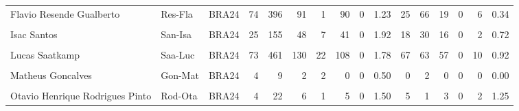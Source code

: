 \documentclass[
]{book}
\begin{document}
\begin{table}[!h]
{\begin{tabular}[t]{lllrrrrrrrrrrrrr}
Flavio Resende Gualberto & Res-Fla & BRA24 & 74 & 396 & 91 & 1 & 90 & 0 & 1.23 & 25 & 66 & 19 & 0 & 6 & 0.34\\
\cellcolor{gray!10}{Henrique Honorato} & \cellcolor{gray!10}{Hon-Hen} & \cellcolor{gray!10}{BRA24} & \cellcolor{gray!10}{1} & \cellcolor{gray!10}{15} & \cellcolor{gray!10}{3} & \cellcolor{gray!10}{0} & \cellcolor{gray!10}{3} & \cellcolor{gray!10}{0} & \cellcolor{gray!10}{3.00} & \cellcolor{gray!10}{0} & \cellcolor{gray!10}{3} & \cellcolor{gray!10}{0} & \cellcolor{gray!10}{0} & \cellcolor{gray!10}{0} & \cellcolor{gray!10}{0.00}\\
Isac Santos & San-Isa & BRA24 & 25 & 155 & 48 & 7 & 41 & 0 & 1.92 & 18 & 30 & 16 & 0 & 2 & 0.72\\
\addlinespace
\cellcolor{gray!10}{Judson Amabel Nunes Da Cunha Jr} & \cellcolor{gray!10}{Nun-Jud} & \cellcolor{gray!10}{BRA24} & \cellcolor{gray!10}{18} & \cellcolor{gray!10}{119} & \cellcolor{gray!10}{28} & \cellcolor{gray!10}{5} & \cellcolor{gray!10}{23} & \cellcolor{gray!10}{0} & \cellcolor{gray!10}{1.56} & \cellcolor{gray!10}{21} & \cellcolor{gray!10}{7} & \cellcolor{gray!10}{18} & \cellcolor{gray!10}{0} & \cellcolor{gray!10}{3} & \cellcolor{gray!10}{1.17}\\
Lucas Saatkamp & Saa-Luc & BRA24 & 73 & 461 & 130 & 22 & 108 & 0 & 1.78 & 67 & 63 & 57 & 0 & 10 & 0.92\\
\cellcolor{gray!10}{Lukas Felipe Bergmann} & \cellcolor{gray!10}{Ber-Luk} & \cellcolor{gray!10}{BRA24} & \cellcolor{gray!10}{15} & \cellcolor{gray!10}{163} & \cellcolor{gray!10}{48} & \cellcolor{gray!10}{5} & \cellcolor{gray!10}{43} & \cellcolor{gray!10}{0} & \cellcolor{gray!10}{3.20} & \cellcolor{gray!10}{22} & \cellcolor{gray!10}{26} & \cellcolor{gray!10}{13} & \cellcolor{gray!10}{0} & \cellcolor{gray!10}{9} & \cellcolor{gray!10}{1.47}\\
Matheus Goncalves & Gon-Mat & BRA24 & 4 & 9 & 2 & 2 & 0 & 0 & 0.50 & 0 & 2 & 0 & 0 & 0 & 0.00\\
\cellcolor{gray!10}{Mauricio Borges Silva} & \cellcolor{gray!10}{Bor-Mau} & \cellcolor{gray!10}{BRA24} & \cellcolor{gray!10}{18} & \cellcolor{gray!10}{127} & \cellcolor{gray!10}{35} & \cellcolor{gray!10}{6} & \cellcolor{gray!10}{29} & \cellcolor{gray!10}{0} & \cellcolor{gray!10}{1.94} & \cellcolor{gray!10}{18} & \cellcolor{gray!10}{17} & \cellcolor{gray!10}{13} & \cellcolor{gray!10}{0} & \cellcolor{gray!10}{5} & \cellcolor{gray!10}{1.00}\\
\addlinespace
Otavio Henrique Rodrigues Pinto & Rod-Ota & BRA24 & 4 & 22 & 6 & 1 & 5 & 0 & 1.50 & 5 & 1 & 3 & 0 & 2 & 1.25\\

\end{tabular}}
\end{table}
\end{document}
